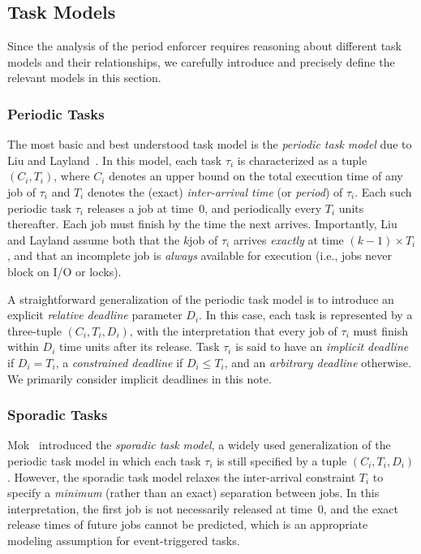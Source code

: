 \subsection{Task Models}
\label{sec:taskmodel}

Since the analysis of the period enforcer requires reasoning about different task models and their relationships, we carefully introduce and precisely define the relevant models in this section.


\subsubsection{Periodic Tasks}

The most basic and best understood task model is the \emph{periodic task model} due to Liu and Layland~\cite{LL:73}. In this model, each task $\tau_i$ is characterized as a tuple $(C_i,T_i)$, where $C_i$ denotes an upper bound on the total execution time of any job of $\tau_i$ and $T_i$ denotes the (exact) \emph{inter-arrival time} (or \emph{period}) of $\tau_i$. Each such periodic task $\tau_i$ releases a job at time~0, and periodically every $T_i$ units thereafter. Each job must finish by the time the next arrives. Importantly, Liu and Layland assume both that the $k$\xth job of $\tau_i$ arrives \emph{exactly} at time $(k-1)\times T_i$, and that an incomplete job is \emph{always} available for execution (i.e., jobs never block on I/O or locks).

A straightforward generalization of the periodic task model is to introduce an explicit \emph{relative deadline} parameter $D_i$. In this case, each task is represented by a three-tuple $(C_i, T_i, D_i)$, with the interpretation that every job of $\tau_i$ must finish within $D_i$ time units after its release. Task $\tau_i$ is said to have an \emph{implicit deadline}  if $D_i = T_i$, a \emph{constrained deadline} if $D_i \leq T_i$, and an \emph{arbitrary deadline} otherwise. We primarily consider implicit deadlines in this note.

\subsubsection{Sporadic Tasks}

Mok~\cite{Mo:83} introduced the \emph{sporadic task model}, a widely used generalization of the periodic task model in which each task $\tau_i$ is still specified by a tuple $(C_i, T_i, D_i)$. However, the sporadic task model relaxes the inter-arrival constraint $T_i$ to specify a \emph{minimum} (rather than an exact) separation between jobs. In this interpretation, the first job is not necessarily released at time~0, and the exact release times of future jobs cannot be predicted, which is an appropriate modeling assumption for event-triggered tasks.

